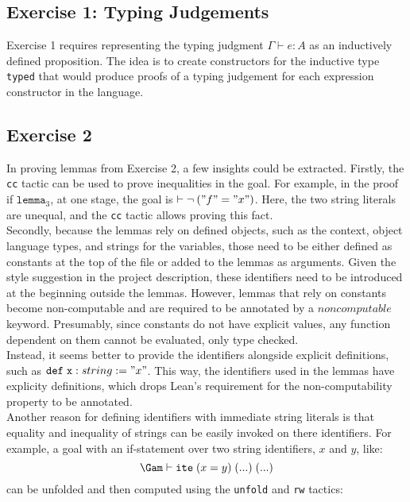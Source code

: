 \documentclass{article}
\newcommand{\tt}[1]{\texttt{#1}}
\begin{document}
\subsection{Exercise 1: Typing Judgements}
Exercise 1 requires representing the typing judgment $\Gamma \vdash e : A$ as an inductively defined proposition. The idea is to create constructors for the inductive type \texttt{typed} that would produce proofs of a typing judgement for each expression constructor in the language.


\subsection{Exercise 2}


In proving lemmas from Exercise 2, a few insights could be extracted. Firstly, the {\tt{cc}} tactic can be used to prove inequalities in the goal. For example, in the proof if ${\tt{lemma}}_3$, at one stage, the goal is $\vdash \neg \: ("f" = "x")$. Here, the two string literals are unequal, and the {\tt{cc}} tactic allows proving this fact. \\

Secondly, because the lemmas rely on defined objects, such as the context, object language types, and strings for the variables, those need to be either defined as constants at the top of the file or added to the lemmas as arguments. Given the style suggestion in the project description, these identifiers need to be introduced at the beginning outside the lemmas. However, lemmas that rely on constants become non-computable and are required to be annotated by a $noncomputable$ keyword. Presumably, since constants do not have explicit values, any function dependent on them cannot be evaluated, only type checked. \\

Instead, it seems better to provide the identifiers alongside explicit definitions, such as ${\tt{def}} \; {\tt{x}} : string := "x"$. This way, the identifiers used in the lemmas have explicity definitions, which drops Lean's requirement for the non-computability property to be annotated. \\

Another reason for defining identifiers with immediate string literals is that equality and inequality of strings can be easily invoked on there identifiers. For example, a goal with an if-statement over two string identifiers, $x$ and $y$, like:
\begin{equation*}
    \Gam \vdash {\tt{ite}} \; (x = y) \; (...) \; (...)
\end{equation*}
can be unfolded and then computed using the {\tt{unfold}} and {\tt{rw}} tactics: \\
\end{document}
